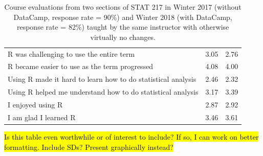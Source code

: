 \documentclass{tise_style_doi}
\begin{document}
\begin{table}
{\begin{tabular}{lcc}
R was challenging to use the entire term	                    &	3.05	&	2.76	\\
R became easier to use as the term progressed	                &	4.08	&	4.00	\\
Using R made it hard to learn how to do statistical analysis	&	2.46	&	2.32	\\
Using R helped me understand how to do statistical analysis	    &	3.17	&	3.39	\\
I enjoyed using R	                                            &	2.87	&	2.92	\\
I am glad I learned R	                                        &	3.46	&	3.61	\\
\bottomrule
\end{tabular}}
\caption{Course evaluations from two sections of STAT 217 in Winter 2017 (without DataCamp, response rate = 90\%)
and Winter 2018 (with DataCamp, response rate = 82\%) taught
by the same instructor with otherwise virtually no changes.}
\label{tab:evals}
\end{table}

\hl{Is this table even worthwhile or of interest to include?  If so, I can work on better formatting.  Include
SDs?  Present graphically instead?}




\end{document}
